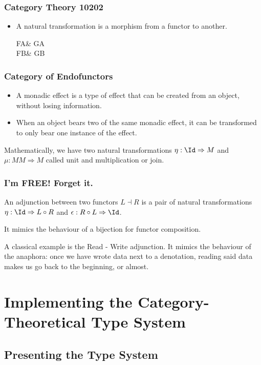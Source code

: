 \documentclass[math, english, info]{beamercours}
\begin{document}
\begin{frame}[fragile]
	\frametitle{Category Theory 10202}
	\begin{itemize}
		\item A natural transformation is a morphism from a functor to another.
		      \pause
		      \begin{category}
			      FA\ar[r, "\theta_{A}"]\ar[d, "F\phi"'] & GA\ar[d, "G\phi"]\\
			      FB\ar[r, "\theta_{B}"'] & GB
		      \end{category}
	\end{itemize}
\end{frame}

\begin{frame}[fragile]
	\frametitle{Category of Endofunctors}
	\begin{itemize}
		\item A monadic effect is a type of effect that can be created from an
		      object, without losing information.
		\item When an object bears two of the same monadic effect, it can be
		      transformed to only bear one instance of the effect.
	\end{itemize}
	\pause

	Mathematically, we have two natural transformations $\eta: \Id \Rightarrow M$
	and $\mu: MM \Rightarrow M$ called unit and multiplication or join.
\end{frame}

\begin{frame}[fragile]
	\frametitle{I'm FREE! Forget it.}
	An adjunction between two functors $L \dashv R$ is a pair of natural
	transformations $\eta: \Id \Rightarrow L \circ R$ and $\epsilon: R \circ L
		\Rightarrow \Id$.

	\smallskip

	It mimics the behaviour of a bijection for functor composition.

	\pause

	A classical example is the Read - Write adjunction.
	It mimics the behaviour of the anaphora: once we have wrote data next to a
	denotation, reading said data makes us go back to the beginning, or almost.
\end{frame}

\section{Implementing the Category-Theoretical Type System}
\subsection{Presenting the Type System}
\end{document}
